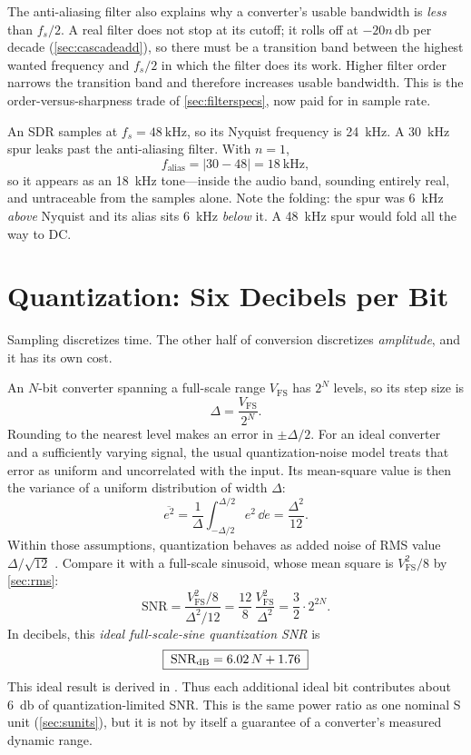 The anti-aliasing filter also explains why a converter's usable bandwidth is
\emph{less} than \(f_s/2\). A real filter does not stop at its cutoff; it rolls off at
\(-20n\,\si{\decibel}\) per decade (\cref{sec:cascadeadd}), so there must be a
transition band between the highest wanted frequency and \(f_s/2\) in which the filter
does its work. Higher filter order narrows the transition band and therefore increases
usable bandwidth. This is the order-versus-sharpness trade of
\cref{sec:filterspecs}, now paid for in sample rate.

\begin{workedbox}
An SDR samples at \(f_s=\SI{48}{\kilo\hertz}\), so its Nyquist frequency is
\SI{24}{\kilo\hertz}. A \SI{30}{\kilo\hertz} spur leaks past the anti-aliasing filter.
With \(n=1\),
\[
f_{\text{alias}}=|30-48|=\SI{18}{\kilo\hertz},
\]
so it appears as an \SI{18}{\kilo\hertz} tone---inside the audio band, sounding
entirely real, and untraceable from the samples alone. Note the folding: the spur was
\SI{6}{\kilo\hertz} \emph{above} Nyquist and its alias sits \SI{6}{\kilo\hertz}
\emph{below} it. A \SI{48}{\kilo\hertz} spur would fold all the way to DC.
\end{workedbox}

\section{Quantization: Six Decibels per Bit}
\label{sec:quantnoise}
Sampling discretizes time. The other half of conversion discretizes \emph{amplitude},
and it has its own cost.

An \(N\)-bit converter spanning a full-scale range \(V_{\mathrm{FS}}\) has
\(2^N\) levels, so its step size is
\[
\Delta=\frac{V_{\mathrm{FS}}}{2^N}.
\]
Rounding to the nearest level makes an error in \(\pm\Delta/2\). For an ideal
converter and a sufficiently varying signal, the usual quantization-noise model
treats that error as uniform and uncorrelated with the input. Its mean-square value
is then the variance of a uniform distribution of width \(\Delta\):
\[
\overline{e^2}=\frac{1}{\Delta}\int_{-\Delta/2}^{\Delta/2}e^2\,\dd e
=\frac{\Delta^2}{12}.
\]
Within those assumptions, quantization behaves as added noise of RMS value
\(\Delta/\sqrt{12}\) \cite[p.~188]{vankka2005synthesizers}. Compare it with a
full-scale sinusoid, whose mean square is \(V_{\mathrm{FS}}^2/8\) by
\cref{sec:rms}:
\[
\mathrm{SNR}=\frac{V_{\mathrm{FS}}^2/8}{\Delta^2/12}
=\frac{12}{8}\,\frac{V_{\mathrm{FS}}^2}{\Delta^2}
=\frac{3}{2}\cdot 2^{2N}.
\]
In decibels, this \emph{ideal full-scale-sine quantization SNR} is
\[
\boxed{\;\mathrm{SNR}_{\mathrm{dB}}=6.02\,N+1.76\;}
\]
This ideal result is derived in \cite[p.~188]{vankka2005synthesizers}.
Thus each additional ideal bit contributes about \SI{6}{\decibel} of
quantization-limited SNR. This is the same power ratio as one nominal S unit
(\cref{sec:sunits}), but it is not by itself a guarantee of a converter's measured
dynamic range.

